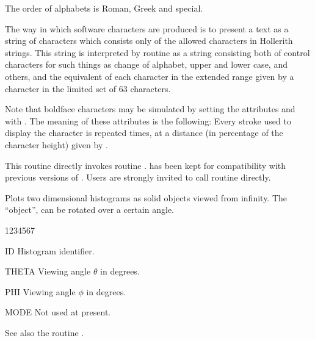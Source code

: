 \begin{UL}
\item The order of alphabets is Roman, Greek and special.
\item The way in which software characters are produced is to present a text as
      a string of characters which consists only of the allowed characters in 
      Hollerith strings. This string is interpreted by routine  as
      a string consisting both of control characters for such things as change 
      of alphabet, upper and lower case, and others, and the equivalent of each 
      character in the extended range given by a character in the limited set of
      63 characters.
\item Note that boldface characters may be simulated by setting the attributes 
       and  with . The meaning of these 
      attributes is the following: Every stroke used to display the character is
      repeated  times, at a distance (in percentage of the character 
      height) given by .
\item This routine directly invokes \HIGZ{} routine . 
      has been kept for compatibility with previous versions of \HPLOT. Users 
      are strongly invited to call \HIGZ{} routine  directly.
\end{UL}


\Action
Plots two dimensional histograms as solid objects viewed from infinity. The 
``object'', can be rotated over a certain angle.
\Pdesc
\begin{DLtt}{1234567}
\item[ID]    Histogram identifier.
\item[THETA] Viewing angle $\theta$ in degrees.
\item[PHI]   Viewing angle $\phi$ in degrees.
\item[MODE]  Not used at present.
\end{DLtt}
\Remark
See also the routine .


